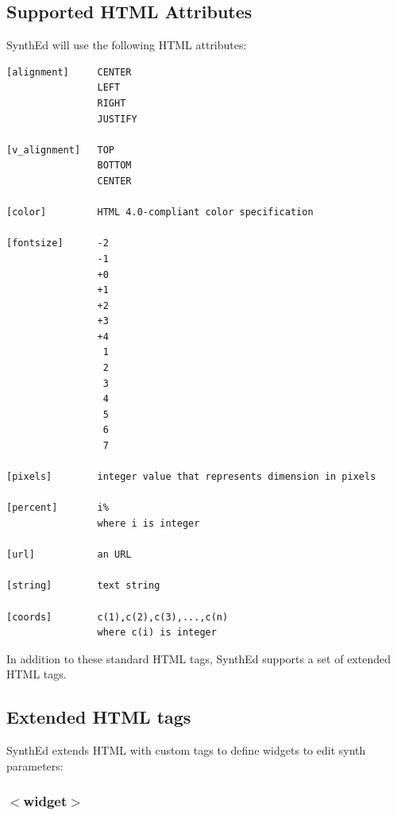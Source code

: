 \documentclass[a4paper,twoside,12pt]{article}
\begin{document}
\subsection{Supported HTML Attributes}

SynthEd will use the following HTML attributes:

\begin{verbatim}
[alignment]     CENTER
                LEFT
                RIGHT
                JUSTIFY

[v_alignment]   TOP
                BOTTOM
                CENTER

[color]         HTML 4.0-compliant color specification

[fontsize]      -2
                -1
                +0
                +1
                +2
                +3
                +4
                 1
                 2
                 3
                 4
                 5
                 6
                 7

[pixels]        integer value that represents dimension in pixels

[percent]       i%
                where i is integer

[url]           an URL

[string]        text string

[coords]        c(1),c(2),c(3),...,c(n)
                where c(i) is integer

\end{verbatim}

In addition to these standard HTML tags, SynthEd supports a set of
extended HTML tags.

\subsection{Extended HTML tags} SynthEd extends HTML with custom
tags to define widgets to edit synth parameters:
\subsubsection{$<$widget$>$}
\end{document}
